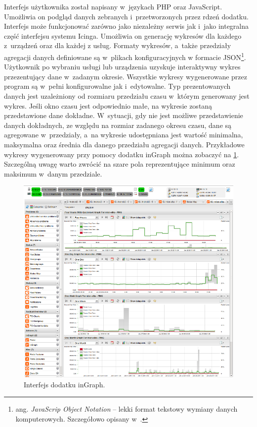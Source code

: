 Interfejs użytkownika został napisany w~językach PHP oraz
JavaScript. Umożliwia on podgląd danych zebranych i~przetworzonych
przez rdzeń dodatku. Interfejs może funkcjonować zarówno jako
niezależny serwis jak i~jako integralna część interfejsu systemu
Icinga. Umożliwia on generację wykresów dla każdego z~urządzeń oraz
dla każdej z usług. Formaty wykresów, a~także przedziały agregacji
danych definiowane są w~plikach konfiguracyjnych w formacie
JSON\footnote{ang. {\em JavaScrip Object Notation} -- lekki format
  tekstowy wymiany danych komputerowych. Szczegółowo opisany w~\cite{www:JSON}.}.
Użytkownik po wybraniu usługi lub urządzenia uzyskuje interaktywny
wykres przezentujący dane w~zadanym okresie. Wszystkie wykresy
wygenerowane przez program są w~pełni konfigurowalne jak
i~edytowalne. Typ prezentowanych danych jest uzależniony od rozmiaru
przedziału czasu w~którym generowany jest wykres. Jeśli okno czasu
jest odpowiednio małe, na wykresie zostaną przedstawione dane
dokładne. W~sytuacji, gdy nie jest możliwe przedstawienie danych
dokładnych, ze względu na rozmiar zadanego okresu czasu, dane są
agregowane w~przedziały, a~na wykresie udostępniana jest wartość
minimalna, maksymalna oraz średnia dla danego przedziału agregacji
danych. Przykładowe wykresy wygenerowany przy pomocy dodatku inGraph
można zobaczyć na \ref{fig:inGraph}. Szczególną uwagę warto zwrócić na
szare pola reprezentujące minimum oraz maksimum w~danym przedziale.

\begin{figure}[ht]
  \caption{Interfejs dodatku inGraph.}
  \label{fig:inGraph}
\includegraphics[width=1\textwidth]{img/ingraph.png}
\end{figure}


